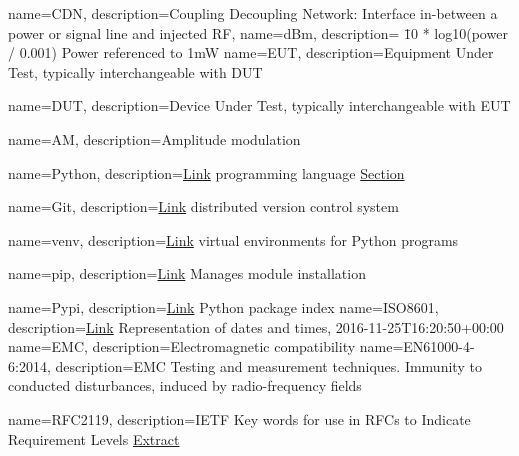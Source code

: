 

 {
  name={CDN},
  description={Coupling Decoupling Network: Interface in-between a power or signal line and injected RF},
}
 {
  name={dBm},
  description={ \= 10 * log10(power / 0.001) Power referenced to 1mW}
}
 {
  name={EUT},
  description={Equipment Under Test, typically interchangeable with \gls{DUT}}
}

 {
  name={DUT},
  description={Device Under Test, typically interchangeable with \gls{EUT}}
}

 {
  name={AM},
  description={Amplitude modulation}
}

 {
  name={Python},
  description={\href{https://www.python.org/}{Link} programming language \hyperref[sec:Python]{Section}}
}

 {
  name={Git},
  description={\href{https://git-scm.com}{Link} distributed version control system}
}

 {
  name={venv},
  description={\href{https://docs.python.org/3/library/venv.html}{Link} virtual environments for Python programs}
}

 {
  name={pip},
  description={\href{https://pypi.python.org/pypi/pip}{Link} Manages module installation}
}

 {
  name={Pypi},
  description={\href{https://pypi.python.org}{Link} Python package index}
}
 {
  name={ISO8601},
  description={\href{https://en.wikipedia.org/wiki/ISO_8601}{Link} Representation of dates and times, 2016-11-25T16:20:50+00:00}
}
 {
  name={EMC},
  description={Electromagnetic compatibility}
}
 {
  name={EN61000-4-6:2014},
  description={EMC Testing and measurement techniques. Immunity to conducted disturbances, induced by radio-frequency fields}
}

 {
  name={RFC2119},
  description={IETF Key words for use in RFCs to Indicate Requirement Levels \hyperref[sec:RFC2119]{Extract}}
}
